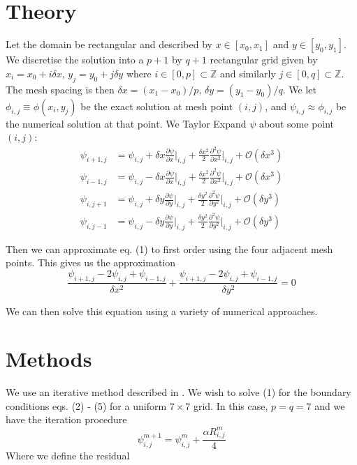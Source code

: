 \documentclass[a4paper,11pt]{article}
\begin{document}
\section{Theory}
Let the domain be rectangular and described by $x \in [x_0, x_1]$ and $y \in [y_0, y_1]$. We discretise the solution into a $p+1$ by $q+1$ rectangular grid given by $x_i = x_0 + i\delta x$, $y_j = y_0 + j\delta y$ where $i \in [0,p] \subset \mathbb{Z}$ and similarly $j\in [0,q] \subset \mathbb{Z}$. The mesh spacing is then $\delta x = (x_1-x_0)/p$, $\delta y = (y_1-y_0)/q$. We let $\phi_{i,j} \equiv \phi(x_i,y_j)$ be the exact solution at mesh point $(i,j)$, and $\psi_{i,j} \approx \phi_{i,j}$ be the numerical solution at that point.
\newline We Taylor Expand $\psi$ about some point $(i,j)$:
\begin{align}
\psi_{i+1,j} &= \psi_{i,j} + \delta x \frac{\partial \psi}{\partial x}\bigg\rvert_{i,j} + \frac{\delta x^2}{2}\frac{\partial^2\psi}{\partial x^2}\bigg\rvert_{i,j} + \mathcal{O}(\delta x^3)\\
\psi_{i-1,j} &= \psi_{i,j} - \delta x \frac{\partial \psi}{\partial x}\bigg\rvert_{i,j} + \frac{\delta x^2}{2}\frac{\partial^2\psi}{\partial x^2}\bigg\rvert_{i,j} + \mathcal{O}(\delta x^3)\\
\psi_{i,j+1} &= \psi_{i,j} + \delta y \frac{\partial \psi}{\partial y}\bigg\rvert_{i,j} + \frac{\delta y^2}{2}\frac{\partial^2\psi}{\partial y^2}\bigg\rvert_{i,j} + \mathcal{O}(\delta y^3)\\
\psi_{i,j-1} &= \psi_{i,j} - \delta y \frac{\partial \psi}{\partial y}\bigg\rvert_{i,j} + \frac{\delta y^2}{2}\frac{\partial^2\psi}{\partial y^2}\bigg\rvert_{i,j} + \mathcal{O}(\delta y^3)
\end{align}

Then we can approximate eq. (1) to first order using the four adjacent mesh points. This gives us the approximation
\begin{equation} 
\frac{\psi_{i+1,j} - 2\psi_{i,j} + \psi_{i-1,j}}{\delta x^2} + \frac{\psi_{i+1,j} - 2\psi_{i,j} + \psi_{i-1,j}}{\delta y^2} = 0
\end{equation}

We can then solve this equation using a variety of numerical approaches. 

\section{Methods}
We use an iterative method described in \cite{script}. We wish to solve (1) for the boundary conditions eqs. (2) - (5) for a uniform $7 \times 7$ grid. In this case, $p = q = 7$ and we have the iteration procedure
\begin{equation}
\psi_{i,j}^{m+1} =  \psi_{i,j}^m + \frac{\alpha R_{i,j}^m}{4}
\end{equation}
Where we define the residual
\end{document}
